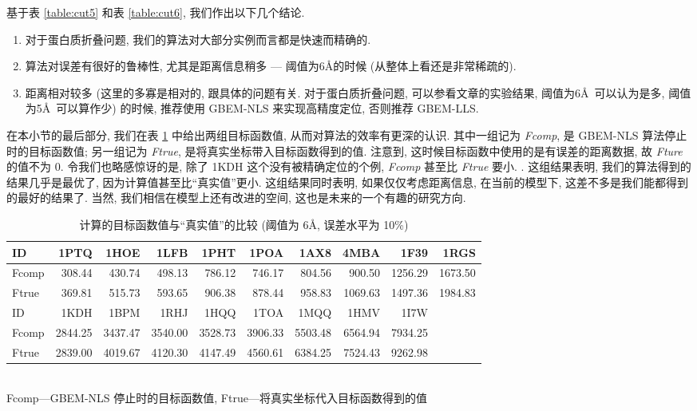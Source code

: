 \documentclass{CASthesis_zzk}
\begin{document}
基于表 \ref{table:cut5} 和表 \ref{table:cut6}, 
我们作出以下几个结论. 
\begin{enumerate}
  \item 对于蛋白质折叠问题, 我们的算法对大部分实例而言都是快速而精确的.
  \item 算法对误差有很好的鲁棒性, 尤其是距离信息稍多 --- 阈值为6\AA 的时候
  (从整体上看还是非常稀疏的).
  \item 距离相对较多 (这里的多寡是相对的, 跟具体的问题有关. 对于蛋白质折叠问题, 可以参看文章的实验结果, 阈值为6\AA ~可以认为是多, 阈值为5\AA ~可以算作少) 的时候, 推荐使用 GBEM-NLS 来实现高精度定位, 否则推荐 GBEM-LLS.
\end{enumerate}

在本小节的最后部分, 我们在表 \ref{table:fval} 中给出两组目标函数值,
从而对算法的效率有更深的认识.
其中一组记为 \emph{Fcomp}, 是 GBEM-NLS 算法停止时的目标函数值;
另一组记为 \emph{Ftrue}, 是将真实坐标带入目标函数得到的值.
注意到, 这时候目标函数中使用的是有误差的距离数据,
故 \emph{Fture} 的值不为 0.
令我们也略感惊讶的是, 除了 1KDH 这个没有被精确定位的个例, 
\emph{Fcomp} 甚至比 \emph{Ftrue} 要小.
.
这组结果表明, 我们的算法得到的结果几乎是最优了,
因为计算值甚至比``真实值''更小.
这组结果同时表明, 如果仅仅考虑距离信息, 在当前的模型下,
这差不多是我们能都得到的最好的结果了.
当然, 我们相信在模型上还有改进的空间, 这也是未来的一个有趣的研究方向.

\setlength{\tabcolsep}{5.5pt}
\begin{table}[!htbp]
  \centering
  \footnotesize{
    \caption{计算的目标函数值与``真实值''的比较 (阈值为 6\AA, 误差水平为 10\%)}
    \begin{tabular}{lrrrrrrrrr}
      \toprule
      ID    & 1PTQ & 1HOE & 1LFB & 1PHT & 1POA & 1AX8 & 4MBA & 1F39 & 1RGS \\
      \midrule
      Fcomp & 308.44 & 430.74 & 498.13 & 786.12 & 746.17 & 804.56 &  900.50	& 1256.29 & 1673.50 \\	
      Ftrue & 369.81 & 515.73 & 593.65 & 906.38	& 878.44 & 958.83 & 1069.63	& 1497.36 & 1984.83	\\
      \midrule
      \midrule
      ID & 1KDH & 1BPM & 1RHJ & 1HQQ & 1TOA & 1MQQ & 1HMV & 1I7W & \\
      \midrule
      Fcomp & 2844.25 &3437.47&	3540.00&	3528.73 & 3906.33 & 5503.48	& 6564.94 & 7934.25 & \\
      Ftrue & 2839.00 &4019.67&	4120.30&	4147.49 & 4560.61 &	6384.25 & 7524.43 &	9262.98 & \\
      \toprule
    \end{tabular}\\[-4mm]
    \label{table:fval}
    \bl *Fcomp---GBEM-NLS 停止时的目标函数值, Ftrue---将真实坐标代入目标函数得到的值
    \el
  }
\end{table}
\end{document}

